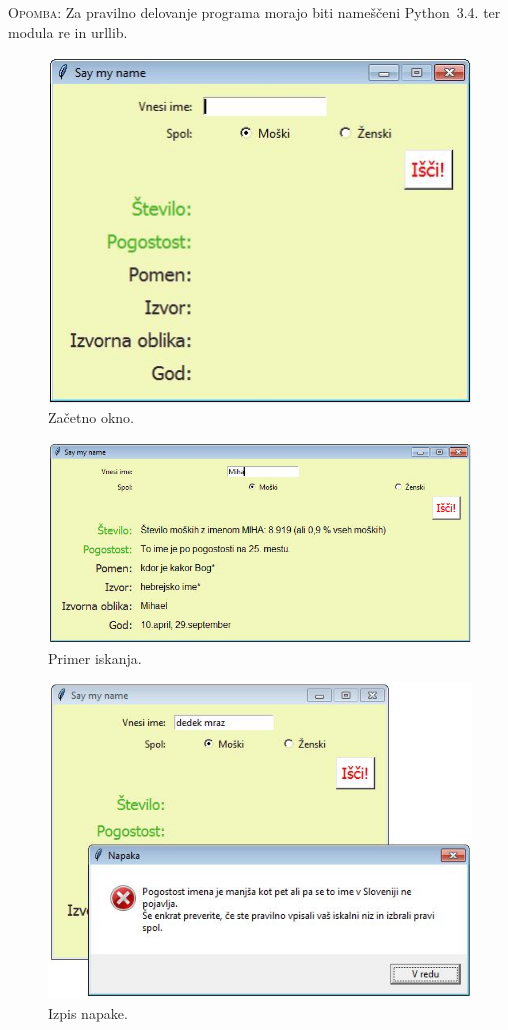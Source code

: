 \documentclass[a4paper, 12pt]{article}
\begin{document}
\textsc{Opomba:} Za pravilno delovanje programa morajo biti nameščeni Python~3.4. ter modula re in urllib.

\begin{figure}[h!]
\centering
\includegraphics[scale=0.8] {zacetek.jpg}
\caption{Začetno okno.}
\end{figure}

\begin{figure}[h!]
\centering
\includegraphics[scale=0.6] {primer.jpg}
\caption{Primer iskanja.}
\end{figure}

\begin{figure}[h!]
\centering
\includegraphics[scale=0.8] {napaka.jpg}
\caption{Izpis napake.}
\end{figure}
\end{document}
